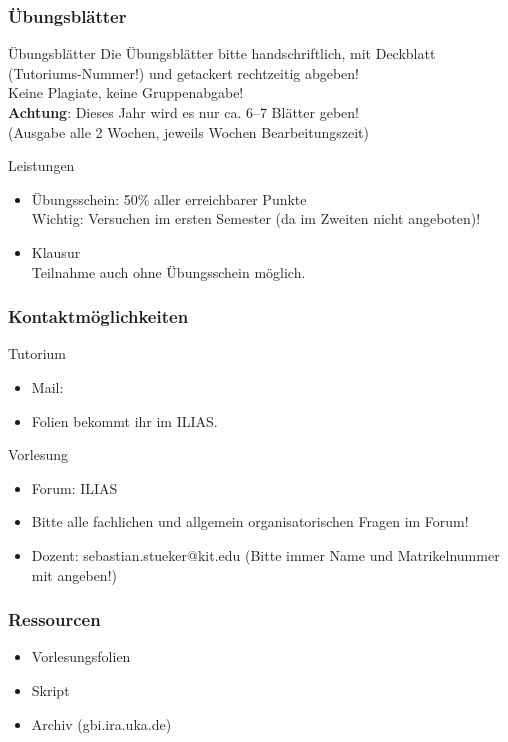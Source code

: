 \begin{frame}
	\frametitle{Übungsblätter}

	\begin{block}{Übungsblätter}
		Die Übungsblätter bitte handschriftlich, mit Deckblatt (Tutoriums-Nummer!) und getackert rechtzeitig	abgeben! \\ \pause
		Keine Plagiate, keine Gruppenabgabe! \\[1em] \pause
		\textbf{Achtung}: Dieses Jahr wird es nur ca. 6--7 Blätter geben! \\
		(Ausgabe alle 2 Wochen, jeweils  Wochen Bearbeitungszeit) 
	\end{block}
	\pause
	\begin{block}{Leistungen}
		\begin{itemize}
			\item Übungsschein: 50\% aller erreichbarer Punkte \\
				  Wichtig: Versuchen im ersten Semester (da im Zweiten nicht angeboten)!
			\item Klausur \\
				  Teilnahme auch ohne Übungsschein möglich.
		\end{itemize}
	\end{block}
\end{frame}

\begin{frame}
	\frametitle{Kontaktmöglichkeiten}
	
	\begin{block}{Tutorium}
		\begin{itemize}
			\item Mail: \mymail
			\item Folien bekommt ihr im ILIAS.
		\end{itemize} 
	\end{block}
	\pause
	
	\begin{block}{Vorlesung}
		\begin{itemize}
			\item Forum: ILIAS
			\item Bitte alle fachlichen und allgemein organisatorischen Fragen im Forum!
			\item Dozent: sebastian.stueker@kit.edu (Bitte immer Name und Matrikelnummer mit angeben!)
		\end{itemize}
	\end{block}
\end{frame}

\begin{frame}
	\frametitle{Ressourcen}
	
	\begin{itemize}
		\item Vorlesungsfolien
		\item Skript
		\item Archiv (gbi.ira.uka.de)
	\end{itemize}
	
\end{frame}


